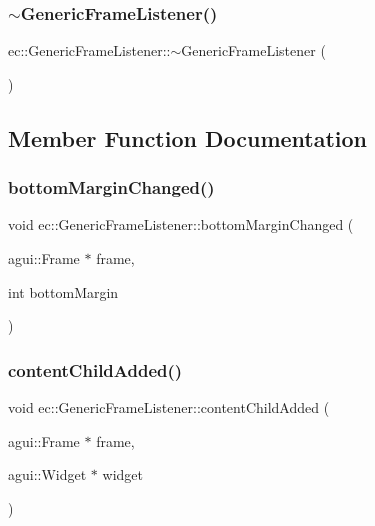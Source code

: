 \subsubsection{\texorpdfstring{$\sim$\+Generic\+Frame\+Listener()}{~GenericFrameListener()}}
{\footnotesize\ttfamily ec\+::\+Generic\+Frame\+Listener\+::$\sim$\+Generic\+Frame\+Listener (\begin{DoxyParamCaption}{ }\end{DoxyParamCaption})\hspace{0.3cm}{\ttfamily [default]}}



\subsection{Member Function Documentation}
\mbox{\label{classec_1_1_generic_frame_listener_af9608075672891583d2710972ad197c8}} 
\subsubsection{\texorpdfstring{bottom\+Margin\+Changed()}{bottomMarginChanged()}}
{\footnotesize\ttfamily void ec\+::\+Generic\+Frame\+Listener\+::bottom\+Margin\+Changed (\begin{DoxyParamCaption}\item[{agui\+::\+Frame $\ast$}]{frame,  }\item[{int}]{bottom\+Margin }\end{DoxyParamCaption})\hspace{0.3cm}{\ttfamily [override]}}

\mbox{\label{classec_1_1_generic_frame_listener_a20561e09362299e4e35655a82ddf8ffd}} 
\subsubsection{\texorpdfstring{content\+Child\+Added()}{contentChildAdded()}}
{\footnotesize\ttfamily void ec\+::\+Generic\+Frame\+Listener\+::content\+Child\+Added (\begin{DoxyParamCaption}\item[{agui\+::\+Frame $\ast$}]{frame,  }\item[{agui\+::\+Widget $\ast$}]{widget }\end{DoxyParamCaption})\hspace{0.3cm}{\ttfamily [override]}}

